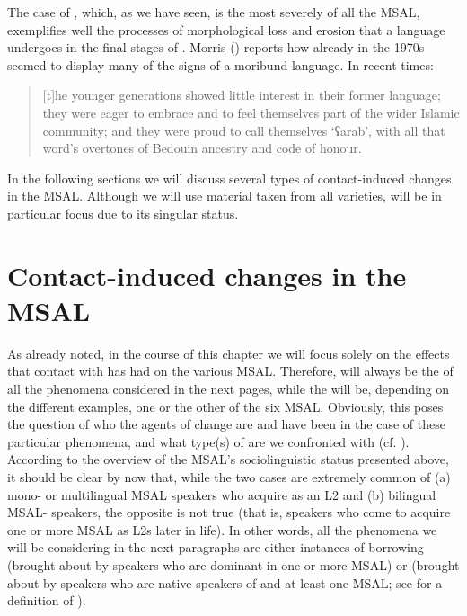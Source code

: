 \documentclass[output=paper]{langsci/langscibook}
\begin{document}
The case of , which, as we have seen, is the most severely  of all the MSAL, exemplifies well the processes of morphological loss and erosion that a language undergoes in the final stages of . Morris (\citeyear{Morris2017}) reports how already in the 1970s  seemed to display many of the signs of a moribund language. In recent times:

\begin{quote}
[t]he younger generations showed little interest in their former language; they were eager to embrace  and to feel themselves part of the wider  Islamic community; and they were proud to call themselves ‘ʕarab’, with all that word’s overtones of Bedouin ancestry and code of honour. \citep[11]{Morris2017}
\end{quote}

In the following sections we will discuss several types of contact-induced changes in the MSAL. Although we will use material taken from all varieties,  will be in particular focus due to its singular status.

\section{Contact-induced changes in the MSAL}\label{sec:3}

As already noted, in the course of this chapter we will focus solely on the effects that contact with  has had on the various MSAL. Therefore,  will always be the  of all the  phenomena considered in the next pages, while the  will be, depending on the different examples, one or the other of the six MSAL. Obviously, this poses the question of who the agents of change are and have been in the case of these particular phenomena, and what type(s) of  are we confronted with (cf. \citealt{VanCoetsem1988,VanCoetsem2000,Winford2005}). According to the overview of the MSAL’s sociolinguistic status presented above, it should be clear by now that, while the two cases are extremely common of (a) mono- or multilingual MSAL speakers who acquire  as an L2 and (b) bilingual MSAL- speakers, the opposite is not true (that is,   speakers who come to acquire one or more MSAL as L2s later in life). In other words, all the  phenomena we will be considering in the next paragraphs are either instances of borrowing (brought about by speakers who are dominant in one or more MSAL) or  (brought about by speakers who are native speakers of  and at least one MSAL; see \citealt{Lucas2015} for a definition of ). 
\end{document}
